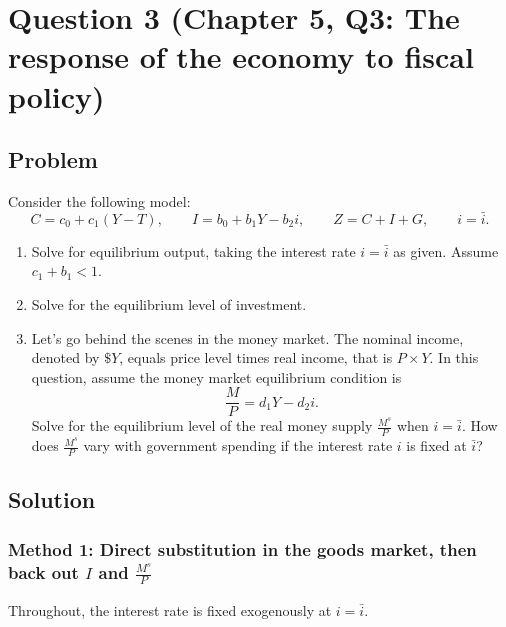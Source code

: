 \documentclass[12pt]{article}
\begin{document}
\newpage

\section*{Question 3 (Chapter 5, Q3: The response of the economy to fiscal policy)}
\subsection*{Problem}
Consider the following model:
\[
C = c_0 + c_1(Y-T),\qquad
I = b_0 + b_1Y - b_2 i,\qquad
Z = C + I + G,\qquad
i=\bar{i}.
\]
\begin{enumerate}[label=(\alph*)]
  \item Solve for equilibrium output, taking the interest rate \(i=\bar{i}\) as given. Assume \(c_1+b_1<1\).
  \item Solve for the equilibrium level of investment.
  \item Let’s go behind the scenes in the money market. The nominal income, denoted by \(\$Y\), equals price level times real income, that is \(P\times Y\). In this question, assume the money market equilibrium condition is
  \[
  \frac{M}{P} = d_1Y - d_2 i.
  \]
  Solve for the equilibrium level of the real money supply \(\frac{M^s}{P}\) when \(i=\bar{i}\). How does \(\frac{M^s}{P}\) vary with government spending if the interest rate \(i\) is fixed at \(\bar{i}\)?
\end{enumerate}

\subsection*{Solution}

\subsubsection*{Method 1: Direct substitution in the goods market, then back out \(I\) and \(\frac{M^s}{P}\)}
Throughout, the interest rate is fixed exogenously at \(i=\bar{i}\).
\end{document}
